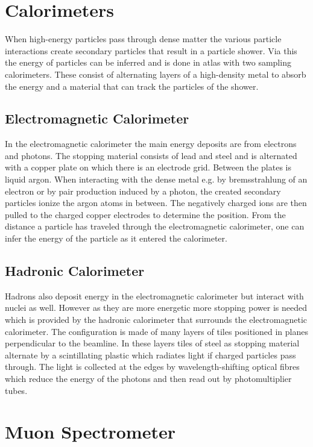\section{Calorimeters}

When high-energy particles pass through dense matter the various particle interactions create secondary particles that result in a particle shower. Via this the energy of particles can be inferred and is done in \ac{atlas} with two sampling calorimeters. These consist of alternating layers of a high-density metal to absorb the energy and a material that can track the particles of the shower.

\subsection*{Electromagnetic Calorimeter}

In the electromagnetic calorimeter the main energy deposits are from electrons and photons. The stopping material consists of lead and steel and is alternated with a copper plate on which there is an electrode grid. Between the plates is liquid argon. When interacting with the dense metal e.g. by bremsstrahlung of an electron or by pair production induced by a photon, the created secondary particles ionize the argon atoms in between. The negatively charged ions are then pulled to the charged copper electrodes to determine the position. From the distance a particle has traveled through the electromagnetic calorimeter, one can infer the energy of the particle as it entered the calorimeter.

\subsection*{Hadronic Calorimeter}

Hadrons also deposit energy in the electromagnetic calorimeter but interact with nuclei as well. However as they are more energetic more stopping power is needed which is provided by the hadronic calorimeter that surrounds the electromagnetic calorimeter. The configuration is made of many layers of tiles positioned in planes perpendicular to the beamline. In these layers tiles of steel as stopping material alternate by a scintillating plastic which radiates light if charged particles pass through. The light is collected at the edges by wavelength-shifting optical fibres  which reduce the energy of the photons and then read out by photomultiplier tubes.

\section{Muon Spectrometer}

